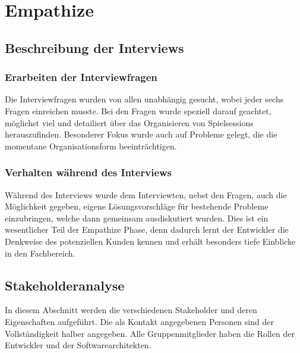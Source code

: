 \section{Empathize}
\subsection{Beschreibung der Interviews}
\subsubsection{Erarbeiten der Interviewfragen}
Die Interviewfragen wurden von allen unabhängig gesucht, wobei jeder sechs Fragen einreichen musste. Bei den Fragen wurde speziell darauf geachtet, möglichst viel und detailiert über das Organisieren von Spielsessions herauszufinden. Besonderer Fokus wurde auch auf Probleme gelegt, die die momentane Organisationsform beeinträchtigen.
\subsubsection{Verhalten während des Interviews}
Während des Interviews wurde dem Interviewten, nebst den Fragen, auch die Möglichkeit gegeben, eigene Lösungsvorschläge für bestehende Probleme einzubringen, welche dann gemeinsam ausdiskutiert wurden. Dies ist ein wesentlicher Teil der Empathize Phase, denn dadurch lernt der Entwickler die Denkweise des potenziellen Kunden kennen und erhält besonders tiefe Einblicke in den Fachbereich.


\subsection{Stakeholderanalyse}
In diesem Abschnitt werden die verschiedenen Stakeholder und deren Eigenschaften
aufgeführt. Die als Kontakt angegebenen Personen sind der Vollständigkeit halber 
angegeben. Alle Gruppenmitglieder haben die Rollen der Entwickler und der 
Softwarearchitekten.

